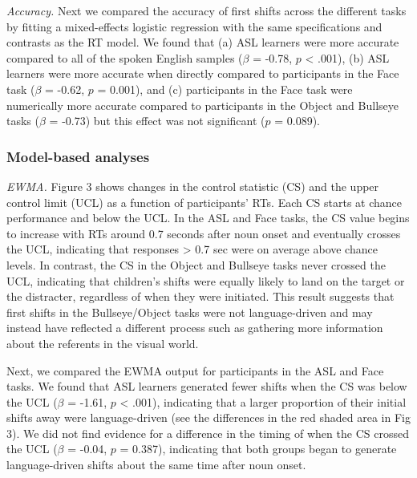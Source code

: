 \documentclass[10pt, letterpaper]{article}
\begin{document}
\emph{Accuracy.} Next we compared the accuracy of first shifts across
the different tasks by fitting a mixed-effects logistic regression with
the same specifications and contrasts as the RT model. We found that (a)
ASL learners were more accurate compared to all of the spoken English
samples (\(\beta\) = -0.78, \(p\) \textless{} .001), (b) ASL learners
were more accurate when directly compared to participants in the Face
task (\(\beta\) = -0.62, \(p\) = 0.001), and (c) participants in the
Face task were numerically more accurate compared to participants in the
Object and Bullseye tasks (\(\beta\) = -0.73) but this effect was not
significant (\(p\) = 0.089).

\subsubsection{Model-based analyses}\label{model-based-analyses}

\emph{EWMA.} Figure 3 shows changes in the control statistic (CS) and
the upper control limit (UCL) as a function of participants' RTs. Each
CS starts at chance performance and below the UCL. In the ASL and Face
tasks, the CS value begins to increase with RTs around 0.7 seconds after
noun onset and eventually crosses the UCL, indicating that responses
\textgreater{} 0.7 sec were on average above chance levels. In contrast,
the CS in the Object and Bullseye tasks never crossed the UCL,
indicating that children's shifts were equally likely to land on the
target or the distracter, regardless of when they were initiated. This
result suggests that first shifts in the Bullseye/Object tasks were not
language-driven and may instead have reflected a different process such
as gathering more information about the referents in the visual world.

Next, we compared the EWMA output for participants in the ASL and Face
tasks. We found that ASL learners generated fewer shifts when the CS was
below the UCL (\(\beta\) = -1.61, \(p\) \textless{} .001), indicating
that a larger proportion of their initial shifts away were
language-driven (see the differences in the red shaded area in Fig 3).
We did not find evidence for a difference in the timing of when the CS
crossed the UCL (\(\beta\) = -0.04, \(p\) = 0.387), indicating that both
groups began to generate language-driven shifts about the same time
after noun onset.
\end{document}
